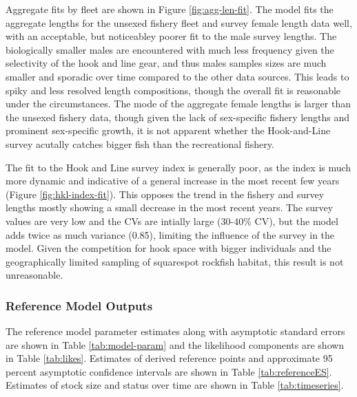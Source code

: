 \documentclass[11pt,
  english,
  a4paper,
]{article}
\begin{document}
Aggregate fits by fleet are shown in Figure \ref{fig:agg-len-fit}. The model fits the aggregate lengths for the unsexed fishery fleet and survey female length data well, with an acceptable, but noticeabley poorer fit to the male survey lengths. The biologically smaller males are encountered with much less frequency given the selectivity of the hook and line gear, and thus males samples sizes are much smaller and sporadic over time compared to the other data sources. This leads to spiky and less resolved length compositions, though the overall fit is reasonable under the circumstances. The mode of the aggregate female lengths is larger than the unsexed fishery data, though given the lack of sex-specific fishery lengths and prominent sex-specific growth, it is not apparent whether the Hook-and-Line survey acutally catches bigger fish than the recreational fishery.

\leavevmode\tagmcend\tagstructend\par


The fit to the Hook and Line survey index is generally poor, as the index is much more dynamic and indicative of a general increase in the most recent few years (Figure \ref{fig:hkl-index-fit}). This opposes the trend in the fishery and survey lengths mostly showing a small decrease in the most recent years. The survey values are very low and the CVs are intially large (30-40\% CV), but the model adds twice as much variance (0.85), limiting the influence of the survey in the model. Given the competition for hook space with bigger individuals and the geographically limited sampling of squarespot rockfish habitat, this result is not unreasonable.

\leavevmode\tagmcend\tagstructend\par


\hypertarget{reference-model-outputs}{%
\subsubsection{Reference Model Outputs}\label{reference-model-outputs}}

\leavevmode\tagmcend\tagstructend


The reference model parameter estimates along with asymptotic standard errors are shown in Table \ref{tab:model-param} and the likelihood components are shown in Table \ref{tab:likes}. Estimates of derived reference points and approximate 95 percent asymptotic confidence intervals are shown in Table \ref{tab:referenceES}. Estimates of stock size and status over time are shown in Table \ref{tab:timeseries}.
\end{document}
